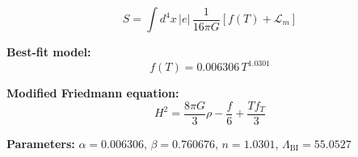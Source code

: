 
\begin{equation}
  S = \int d^4x \, |e| \, \frac{1}{16\pi G} \left[ f(T) + \mathcal{L}_m \right]
\end{equation}

\textbf{Best-fit model:}
\begin{equation}
  f(T) = 0.006306 \, T^{1.0301}
\end{equation}

\textbf{Modified Friedmann equation:}
\begin{equation}
  H^2 = \frac{8\pi G}{3} \rho - \frac{f}{6} + \frac{T f_T}{3}
\end{equation}

\textbf{Parameters:}
$\alpha = 0.006306$, \quad
$\beta = 0.760676$, \quad
$n = 1.0301$, \quad
$\Lambda_{\text{BI}} = 55.0527$
